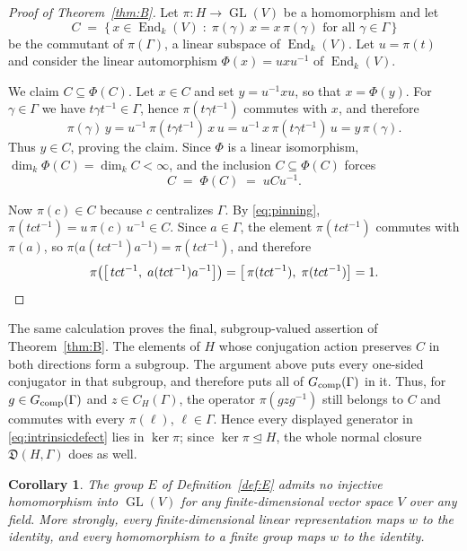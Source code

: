\documentclass[11pt]{amsart}
\newcommand{\leanverified}[2]{\ignorespaces}
\newtheorem{corollary}[theorem]{Corollary}
\theoremstyle{definition}
\theoremstyle{remark}
\theoremstyle{plain}
\newcommand{\GL}{\operatorname{GL}}
\newcommand{\End}{\operatorname{End}}
\begin{document}
\begin{proof}[Proof of Theorem~\ref{thm:B}]
Let $\pi\colon H\to\GL(V)$ be a homomorphism and let
\[
  C\;=\;\{\,x\in\End_k(V)\;:\;\pi(\gamma)\,x=x\,\pi(\gamma)
  \text{ for all }\gamma\in\Gamma\,\}
\]
be the commutant of $\pi(\Gamma)$, a linear subspace of $\End_k(V)$.
Let $u=\pi(t)$ and consider the linear automorphism
$\Phi(x)=uxu^{-1}$ of $\End_k(V)$.

We claim $C\subseteq\Phi(C)$.  Let $x\in C$ and set $y=u^{-1}xu$, so
that $x=\Phi(y)$.  For $\gamma\in\Gamma$ we have
$t\gamma t^{-1}\in\Gamma$, hence $\pi(t\gamma t^{-1})$ commutes with
$x$, and therefore
\[
  \pi(\gamma)\,y
  = u^{-1}\,\pi(t\gamma t^{-1})\,x\,u
  = u^{-1}\,x\,\pi(t\gamma t^{-1})\,u
  = y\,\pi(\gamma).
\]
Thus $y\in C$, proving the claim.  Since $\Phi$ is a linear
isomorphism, $\dim_k\Phi(C)=\dim_kC<\infty$, and the inclusion
$C\subseteq\Phi(C)$ forces
\begin{equation}\label{eq:pinning}
  C\;=\;\Phi(C)\;=\;uCu^{-1}.
\end{equation}

Now $\pi(c)\in C$ because $c$ centralizes $\Gamma$.  By
\eqref{eq:pinning}, $\pi(tct^{-1})=u\,\pi(c)\,u^{-1}\in C$.  Since
$a\in\Gamma$, the element $\pi(tct^{-1})$ commutes with $\pi(a)$, so
$\pi\bigl(a(tct^{-1})a^{-1}\bigr)=\pi(tct^{-1})$, and therefore
\[
  \pi\bigl(\bigl[\,tct^{-1},\;a(tct^{-1})a^{-1}\bigr]\bigr)
  =\bigl[\,\pi(tct^{-1}),\;\pi(tct^{-1})\bigr]=1. \qedhere
\]
\end{proof}

The same calculation proves the final, subgroup-valued assertion of
Theorem~\ref{thm:B}.  The elements of $H$ whose conjugation action
preserves $C$ in both directions form a subgroup.  The argument above
puts every one-sided conjugator in that subgroup, and therefore puts all
of $G_{\rm comp}(\Gamma)$ in it.  Thus, for $g\in
G_{\rm comp}(\Gamma)$ and $z\in C_H(\Gamma)$, the operator
$\pi(gzg^{-1})$ still belongs to $C$ and commutes with every
$\pi(\ell)$, $\ell\in\Gamma$.  Hence every displayed generator in
\eqref{eq:intrinsicdefect} lies in $\ker\pi$; since
$\ker\pi\trianglelefteq H$, the whole normal closure
$\mathfrak D(H,\Gamma)$ does as well.

\begin{corollary}\label{cor:notRFD}
The group $E$ of Definition~\ref{def:E} admits no injective homomorphism
into $\GL(V)$ for any finite-dimensional vector space $V$ over any field.
More strongly, every finite-dimensional linear representation maps $w$ to
the identity, and every homomorphism to a finite group maps $w$ to the
identity.
\leanverified{Sofic/LiteralFiniteDimensionalObstruction}{GroupApproximation.LiteralFiniteDimensionalObstruction.manuscriptFiniteDimensionalConsequences}
\end{corollary}
\end{document}
